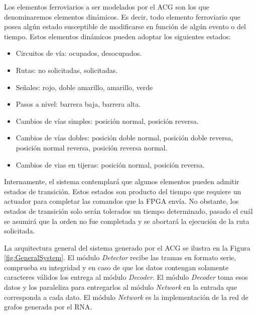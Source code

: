 	Los elementos ferroviarios a ser modelados por el ACG son los que denominaremos elementos dinámicos. Es decir, todo elemento ferroviario que posea algún estado susceptible de modificarse en función de algún evento o del tiempo. Estos elementos dinámicos pueden adoptar los siguientes estados:
	
	\begin{itemize}
		\item Circuitos de vía: ocupados, desocupados.
		\item Rutas: no solicitadas, solicitadas.
		\item Señales: rojo, doble amarillo, amarillo, verde
		\item Pasos a nivel: barrera baja, barrera alta.
		\item Cambios de vías simples: posición normal, posición reversa.
		\item Cambios de vías dobles: posición doble normal, posición doble reversa, posición normal reversa, posición reversa normal.
		\item Cambios de vias en tijeras: posición normal, posición reversa.
	\end{itemize}
	
	Internamente, el sistema contemplará que algunos elementos pueden admitir estados de transición. Estos estados son producto del tiempo que requiere un actuador para completar las comandos que la FPGA envía. No obstante, los estados de transición solo serán tolerados un tiempo determinado, pasado el cuál se asumirá que la orden no fue completada y se abortará la ejecución de la ruta solicitada.
	
	La arquitectura general del sistema generado por el ACG se ilustra en la Figura \ref{fig:GeneralSystem}. El módulo \textit{Detector} recibe las tramas en formato serie, comprueba su integridad y en caso de que los datos contengan solamente caracteres válidos los entrega al módulo \textit{Decoder}. El módulo \textit{Decoder} toma esos datos y los paraleliza para entregarlos al módulo \textit{Network} en la entrada que corresponda a cada dato. El módulo \textit{Network} es la implementación de la red de grafos generada por el RNA. 
	
